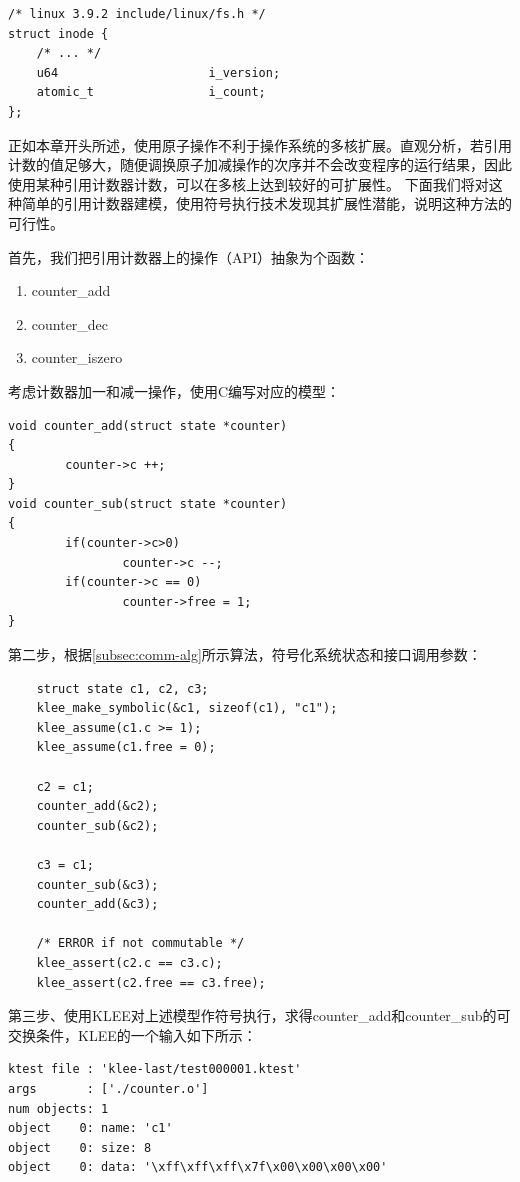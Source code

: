 \begin{Code}
	\centering
\begin{lstlisting}
/* linux 3.9.2 include/linux/fs.h */
struct inode {
	/* ... */
	u64                     i_version;
	atomic_t                i_count;
};
\end{lstlisting}
\end{Code}

正如本章开头所述，使用原子操作不利于操作系统的多核扩展。直观分析，若引用计数的值足够大，随便调换原子加减操作的次序并不会改变程序的运行结果，因此使用某种引用计数器计数，可以在多核上达到较好的可扩展性。
下面我们将对这种简单的引用计数器建模，使用符号执行技术发现其扩展性潜能，说明这种方法的可行性。

首先，我们把引用计数器上的操作（API）抽象为个函数：
\begin{enumerate}
\item counter\_add
\item counter\_dec
\item counter\_iszero
\end{enumerate}

考虑计数器加一和减一操作，使用C编写对应的模型：

\begin{lstlisting}
void counter_add(struct state *counter)
{
        counter->c ++;
}
void counter_sub(struct state *counter)
{
        if(counter->c>0)
                counter->c --;
        if(counter->c == 0)
                counter->free = 1;
}
\end{lstlisting}

第二步，根据\ref{subsec:comm-alg}所示算法，符号化系统状态和接口调用参数：

\begin{lstlisting}
	struct state c1, c2, c3;
	klee_make_symbolic(&c1, sizeof(c1), "c1");
	klee_assume(c1.c >= 1);
	klee_assume(c1.free = 0);

	c2 = c1;
	counter_add(&c2);
	counter_sub(&c2);

	c3 = c1;
	counter_sub(&c3);
	counter_add(&c3);

	/* ERROR if not commutable */
	klee_assert(c2.c == c3.c);
	klee_assert(c2.free == c3.free);
\end{lstlisting}

第三步、使用KLEE对上述模型作符号执行，求得counter\_add和counter\_sub的可交换条件，KLEE的一个输入如下所示：

\begin{lstlisting}[caption=KLEE输出样例]
ktest file : 'klee-last/test000001.ktest'
args       : ['./counter.o']
num objects: 1
object    0: name: 'c1'
object    0: size: 8
object    0: data: '\xff\xff\xff\x7f\x00\x00\x00\x00'
\end{lstlisting}

